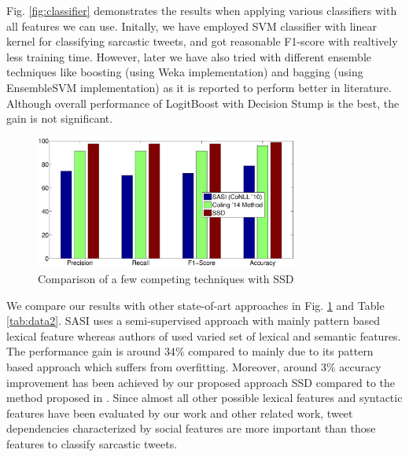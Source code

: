 Fig. \ref{fig:classifier} demonstrates the results when applying various classifiers with all features we can use. Initally, we have employed SVM classifier with linear kernel for classifying sarcastic tweets, and got reasonable F1-score with realtively less training time. However, later we have also tried with different ensemble techniques like boosting (using Weka implementation) and bagging (using EnsembleSVM implementation) as it is reported to perform better in literature. Although overall performance of LogitBoost with Decision Stump is the best, the gain is not significant.\\

\begin{figure}[hbt]
\centering
\includegraphics[width=3.4in, height= 2.4 in]{./figs/compare_systems.eps}
\caption{Comparison of a few competing techniques with SSD}
\label{fig:comparison}
\end{figure}

We compare our results with other state-of-art approaches in Fig. \ref{fig:comparison} and Table \ref{tab:data2}. SASI \cite{davidov10} uses a semi-supervised approach with mainly pattern based lexical feature whereas authors of \cite{tomas14} used varied set of lexical and semantic features. The performance gain is around $34\%$ compared to \cite{davidov10} mainly due to its pattern based approach which suffers from overfitting. Moreover, around $3\%$ accuracy improvement has been achieved by our proposed approach SSD compared to the method proposed in \cite{tomas14}. Since almost all other possible lexical features and syntactic features have been evaluated by our work and other related work, tweet dependencies characterized by social features are more important than those features to classify sarcastic tweets.

